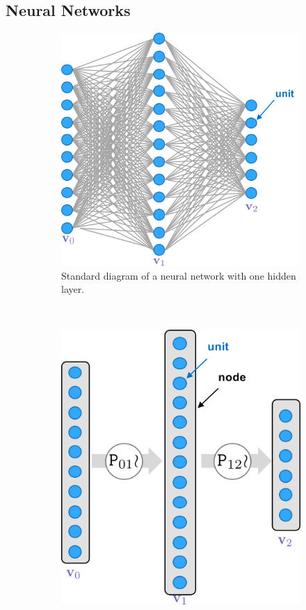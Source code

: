 \documentclass[thesis]{subfiles}
\begin{document}
\subsection{Neural Networks}
\begin{figure}[htbp!] 
\centering
\begin{subfigure}[b]{0.45\textwidth}
   \includegraphics[width=\textwidth]{fullyconnected}
   \caption{Standard diagram of a neural network with one hidden layer.}
   \label{fig:oldnotation}
\end{subfigure}
~
\begin{subfigure}[b]{0.4\textwidth}
   \includegraphics[width=\textwidth]{newnotation}

\end{subfigure}
\end{figure}
\end{document}
